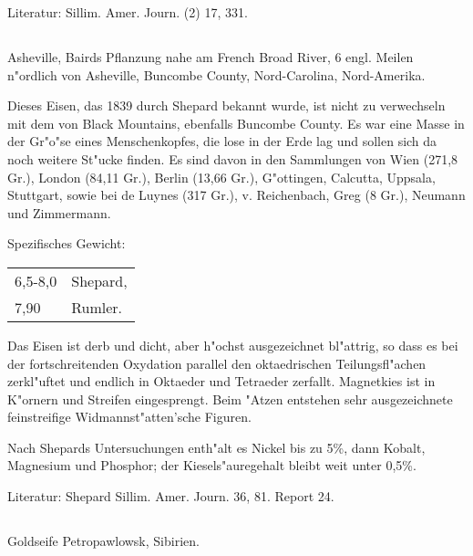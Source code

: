 \documentclass[a4paper, 11pt, oneside]{article}
\begin{document}
\normalsize
Literatur: Sillim. Amer. Journ. (2) 17, 331.

\subsection{}
\LARGE
\paragraph{}
Asheville, Bairds Pflanzung nahe am French Broad River, 6 engl. Meilen n"ordlich von Asheville, Buncombe County, Nord-Carolina, Nord-Amerika.

Dieses Eisen, das 1839 durch Shepard bekannt wurde, ist nicht zu verwechseln mit dem von Black Mountains, ebenfalls Buncombe County. Es war eine Masse in der Gr"o"se eines Menschenkopfes, die lose in der Erde lag und sollen sich da noch weitere St"ucke finden. Es sind davon in den Sammlungen von Wien (271,8 Gr.), London (84,11 Gr.), Berlin (13,66 Gr.), G"ottingen, Calcutta, Uppsala, Stuttgart, sowie bei de Luynes (317 Gr.), v. Reichenbach, Greg (8 Gr.), Neumann und Zimmermann.

Spezifisches Gewicht:  
\begin{table}[!ht]
    \centering\swabfamily\Large
    \begin{tabular}{l l}
        6,5-8,0 & Shepard,\\
        7,90 & Rumler.
    \end{tabular}
\end{table}

Das Eisen ist derb und dicht, aber h"ochst ausgezeichnet bl"attrig, so dass es bei der fortschreitenden Oxydation parallel den oktaedrischen Teilungsfl"achen zerkl"uftet und endlich in Oktaeder und Tetraeder zerfallt. Magnetkies ist in K"ornern und Streifen eingesprengt. Beim "Atzen entstehen sehr ausgezeichnete feinstreifige Widmannst"atten'sche Figuren.

Nach Shepards Untersuchungen enth"alt es Nickel bis zu 5\%, dann Kobalt, Magnesium und Phosphor; der Kiesels"auregehalt bleibt weit unter 0,5\%.

\normalsize
Literatur: Shepard Sillim. Amer. Journ. 36, 81. Report 24.

\subsection{}
\LARGE
\paragraph{}
Goldseife Petropawlowsk, Sibirien.
\end{document}
